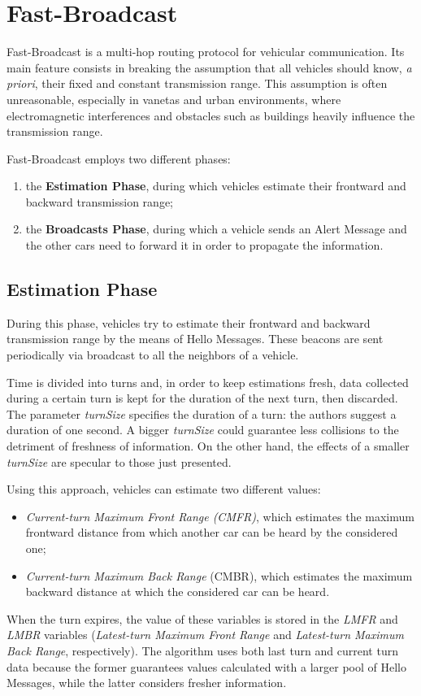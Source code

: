 
\chapter{Fast-Broadcast}
	\label{chapter:fb}
	Fast-Broadcast \cite{4199282} is a multi-hop routing protocol for vehicular communication. Its main feature consists in breaking the assumption that all vehicles should know, \textit{a priori}, their fixed and constant transmission range. This assumption is often unreasonable, especially in \acrshort{vaneta}s and urban environments, where electromagnetic interferences and obstacles such as buildings heavily influence the transmission range.
	
	
	Fast-Broadcast employs two different phases:
	\begin{enumerate}
		\item the \textbf{Estimation Phase}, during which vehicles estimate their frontward and backward transmission range;
		\item the \textbf{Broadcasts Phase}, during which a vehicle sends an Alert Message and the other cars need to forward it in order to propagate the information.
	\end{enumerate}

	\section{Estimation Phase}
		During this phase, vehicles try to estimate their frontward and backward transmission range by the means of Hello Messages. These beacons are sent periodically via broadcast to all the neighbors of a vehicle.
		
		
		Time is divided into turns and, in order to keep estimations fresh, data collected during a certain turn is kept for the duration of the next turn, then discarded. The parameter \textit{turnSize} specifies the duration of a turn: the authors suggest a duration of one second. A bigger \textit{turnSize} could guarantee less collisions to the detriment of freshness of information. On the other hand, the effects of a smaller \textit{turnSize} are specular to those just presented. 
		
		
		Using this approach, vehicles can estimate two different values:
		\begin{itemize}
			\item \textit{Current-turn Maximum Front Range (CMFR)}, which estimates the maximum frontward distance from which another car can be heard by the considered one;
			\item \textit{Current-turn Maximum Back Range} (CMBR), which estimates the maximum backward distance at which the considered car can be heard.
		\end{itemize}
		When the turn expires, the value of these variables is stored in the \textit{LMFR} and \textit{LMBR} variables (\textit{Latest-turn Maximum Front Range} and \textit{Latest-turn Maximum Back Range}, respectively). The algorithm uses both last turn and current turn data because the former guarantees values calculated with a larger pool of Hello Messages, while the latter considers fresher information.
		
